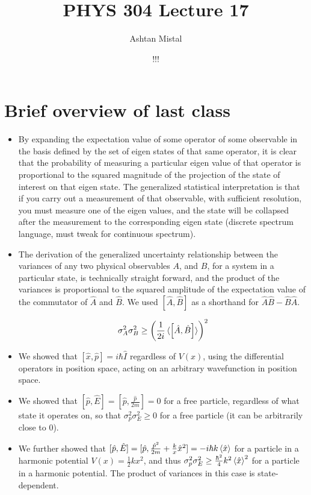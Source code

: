 \documentclass{article}
\title{PHYS 304 Lecture 17}
\author{Ashtan Mistal}
\date{!!!}
\begin{document}
\ifstandalone
\maketitle
\fi

\graphicspath{{./Lecture17/}}


\section{Brief overview of last class}

\begin{itemize}
    \item By expanding the expectation value of some operator of some observable in the basis defined by the set of eigen states of that same operator, it is clear that the probability of measuring a particular eigen value of that operator is proportional to the squared magnitude of the projection of the state of interest on that eigen state.  The generalized statistical interpretation is that if you carry out a measurement of that observable, with sufficient resolution, you must measure one of the eigen values, and the state will be collapsed after the measurement to the corresponding eigen state (discrete spectrum language, must tweak for continuous spectrum).
    
    \item The derivation of the generalized uncertainty relationship between the variances of any two physical observables $A$, and $B$, for a system in a particular state, is technically straight forward, and the product of the variances is proportional to the squared amplitude of the expectation value of the commutator of $\hat{A}$ and $\hat{B}$. We used $[\hat{A}, \hat{B}]$ as a shorthand for $\hat{A} \hat{B} - \hat{B} \hat{A}$.  
    
    $$\sigma_A^2 \sigma_B^2 \geq \left( \frac{1}{2i} \braket{\left[ \hat{A}, \hat{B} \right]} \right)^2$$
    
    \item We showed that $[\hat{x}, \hat{p}] = i \hbar \hat{I}$ regardless of $V(x)$, using the differential operators in position space, acting on an arbitrary wavefunction in position space. 
    
    \item We showed that $[\hat{p}, \hat{E}] = [\hat{p}, \frac{\hat{p}}{2m}] = 0$ for a free particle, regardless of what state it operates on, so that $\sigma_p^2 \sigma_E^2 \geq 0$ for a free particle (it can be arbitrarily close to 0). 
    
    \item We further showed that $[\hat{p}, \hat{E}] = [\hat{p}, \frac{\hat{p}^2}{2m} + \frac{k}{x} \hat{x}^2] = -i\hbar k \braket{\hat{x}}$ for a particle in a harmonic potential $V(x) = \frac{1}{2}kx^2$, and thus $\sigma_p^2 \sigma_E^2 \geq \frac{\hbar^2}{4} k^2 \braket{\hat{x}}^2$ for a particle in a harmonic potential. The product of variances in this case is state-dependent.  

\end{itemize}
\end{document}
